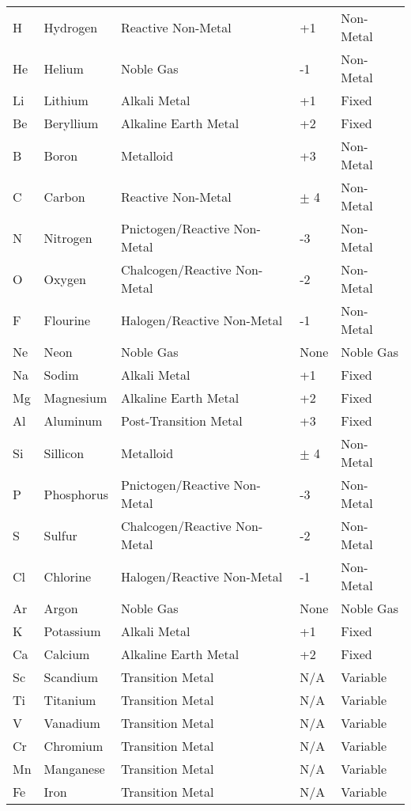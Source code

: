 \begin{center}
\begin{longtable}{|l|l|l|l|l|}
H 	& Hydrogen 		& Reactive Non-Metal 				& +1 	 	& Non-Metal 	\\
He 	& Helium 		& Noble Gas 						& -1 	 	& Non-Metal 	\\
Li 	& Lithium 		& Alkali Metal 						& +1 	 	& Fixed 		\\
Be 	& Beryllium 	& Alkaline Earth Metal 				& +2 	 	& Fixed 		\\
B 	& Boron 		& Metalloid 						& +3 	 	& Non-Metal 	\\
C 	& Carbon 		& Reactive Non-Metal 				& $\pm$ 4	& Non-Metal 	\\
N 	& Nitrogen 		& Pnictogen/Reactive Non-Metal 		& -3 	 	& Non-Metal 	\\
O 	& Oxygen 		& Chalcogen/Reactive Non-Metal 		& -2 	 	& Non-Metal 	\\
F 	& Flourine 		& Halogen/Reactive Non-Metal 		& -1 	 	& Non-Metal 	\\
Ne 	& Neon 			& Noble Gas 						& None	 	& Noble Gas 	\\
Na 	& Sodim 		& Alkali Metal 						& +1 		& Fixed 		\\
Mg 	& Magnesium 	& Alkaline Earth Metal 				& +2		& Fixed 		\\
Al 	& Aluminum 		& Post-Transition Metal 			& +3 		& Fixed			\\
Si 	& Sillicon 		& Metalloid 						& $\pm$ 4	& Non-Metal		\\
P 	& Phosphorus	& Pnictogen/Reactive Non-Metal 		& -3 		& Non-Metal		\\
S 	& Sulfur 		& Chalcogen/Reactive Non-Metal 		& -2 		& Non-Metal		\\
Cl 	& Chlorine 		& Halogen/Reactive Non-Metal 		& -1		& Non-Metal		\\
Ar 	& Argon 		& Noble Gas							& None		& Noble Gas		\\
K 	& Potassium 	& Alkali Metal 						& +1 		& Fixed 		\\
Ca 	& Calcium 		& Alkaline Earth Metal 				& +2		& Fixed			\\
Sc 	& Scandium 		& Transition Metal 					& N/A		& Variable 		\\
Ti 	& Titanium 		& Transition Metal 					& N/A 		& Variable 		\\
V 	& Vanadium 		& Transition Metal 					& N/A 		& Variable 		\\
Cr 	& Chromium 		& Transition Metal 					& N/A 		& Variable		\\
Mn 	& Manganese 	& Transition Metal 					& N/A 		& Variable		\\
Fe 	& Iron 			& Transition Metal 					& N/A 		& Variable 		\\

\end{longtable}
\end{center}
